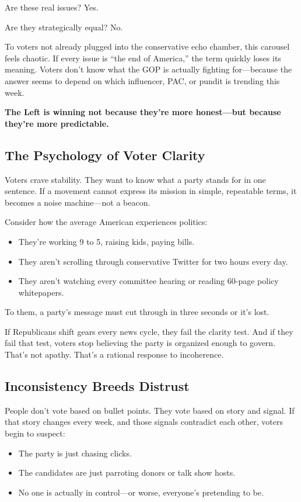 Are these real issues? Yes.

Are they strategically equal? No.

To voters not already plugged into the conservative echo chamber, this carousel feels chaotic. If every issue is “the end of America,” the term quickly loses its meaning. Voters don’t know what the GOP is actually fighting for—because the answer seems to depend on which influencer, PAC, or pundit is trending this week.

\textbf{The Left is winning not because they’re more honest—but because they’re more predictable.}

\subsection*{The Psychology of Voter Clarity}

Voters crave stability. They want to know what a party stands for in one sentence. If a movement cannot express its mission in simple, repeatable terms, it becomes a noise machine—not a beacon.

Consider how the average American experiences politics:
\begin{itemize}
    \item They’re working 9 to 5, raising kids, paying bills.
    \item They aren’t scrolling through conservative Twitter for two hours every day.
    \item They aren’t watching every committee hearing or reading 60-page policy whitepapers.
\end{itemize}

To them, a party’s message must cut through in three seconds or it’s lost.

If Republicans shift gears every news cycle, they fail the clarity test. And if they fail that test, voters stop believing the party is organized enough to govern. That’s not apathy. That’s a rational response to incoherence.

\subsection*{Inconsistency Breeds Distrust}

People don’t vote based on bullet points. They vote based on story and signal. If that story changes every week, and those signals contradict each other, voters begin to suspect:
\begin{itemize}
    \item The party is just chasing clicks.
    \item The candidates are just parroting donors or talk show hosts.
    \item No one is actually in control—or worse, everyone’s pretending to be.
\end{itemize}

